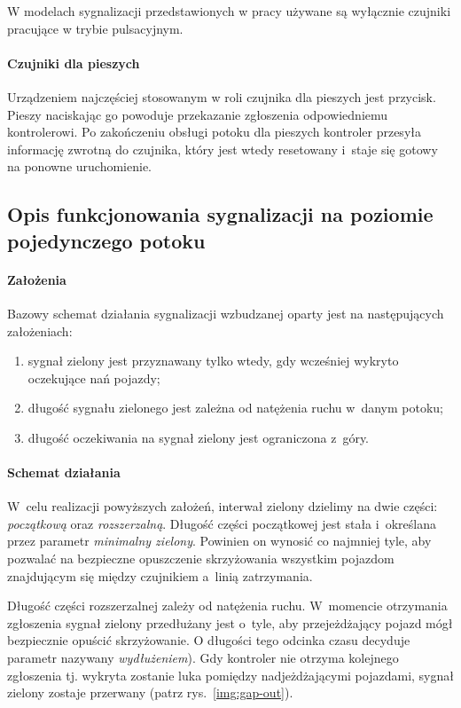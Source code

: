 \documentclass{pracamgr}
\newcommand{\imgr}[1]{rys.~\ref{#1}}
\theoremstyle{plain}
\begin{document}
W modelach sygnalizacji przedstawionych w pracy używane są wyłącznie
czujniki pracujące w trybie pulsacyjnym.

\paragraph{Czujniki dla pieszych} Urządzeniem najczęściej stosowanym w
roli czujnika dla pieszych jest przycisk. Pieszy naciskając go powoduje
przekazanie zgłoszenia odpowiedniemu kontrolerowi. Po zakończeniu
obsługi potoku dla pieszych kontroler przesyła informację zwrotną do
czujnika, który jest wtedy resetowany i~staje się gotowy na ponowne
uruchomienie.

\subsection{Opis funkcjonowania sygnalizacji na poziomie pojedynczego
potoku}
\label{ss:schemat}

\paragraph{Założenia} Bazowy schemat działania sygnalizacji wzbudzanej
oparty jest na następujących założeniach:
\begin{enumerate}
  \item sygnał zielony jest przyznawany tylko wtedy, gdy wcześniej
  wykryto oczekujące nań pojazdy;
  \item długość sygnału zielonego jest zależna od natężenia ruchu
  w~danym potoku;
  \item długość oczekiwania na sygnał zielony jest ograniczona z~góry.
\end{enumerate}

\paragraph{Schemat działania} W~celu realizacji powyższych założeń,
interwał zielony dzielimy na dwie części: \emph{początkową} oraz
\emph{rozszerzalną}. Długość części początkowej jest stała i~określana
przez parametr \emph{minimalny zielony}. Powinien on wynosić co
najmniej tyle, aby pozwalać na bezpieczne opuszczenie skrzyżowania
wszystkim pojazdom znajdującym się między czujnikiem a~linią
zatrzymania.

Długość części rozszerzalnej zależy od natężenia ruchu. W~momencie
otrzymania zgłoszenia sygnał zielony przedłużany jest o~tyle, aby
przejeżdżający pojazd mógł bezpiecznie opuścić skrzyżowanie. O
długości tego odcinka czasu decyduje parametr nazywany
\emph{wydłużeniem}). Gdy kontroler nie otrzyma kolejnego
zgłoszenia tj. wykryta zostanie luka pomiędzy nadjeżdżającymi
pojazdami, sygnał zielony zostaje przerwany (patrz
\imgr{img:gap-out}).
\end{document}

